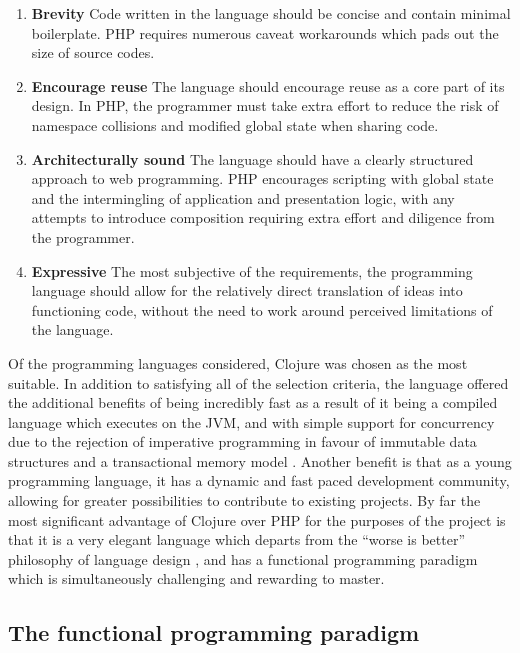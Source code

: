 \begin{enumerate}
\item \textbf{Brevity} Code written in the language should be concise
  and contain minimal boilerplate. PHP requires numerous caveat
  workarounds which pads out the size of source codes.
\item \textbf{Encourage reuse} The language should encourage reuse as
  a core part of its design. In PHP, the programmer must take extra
  effort to reduce the risk of namespace collisions and modified
  global state when sharing code.
\item \textbf{Architecturally sound} The language should have a
  clearly structured approach to web programming. PHP encourages
  scripting with global state and the intermingling of application and
  presentation logic, with any attempts to introduce composition
  requiring extra effort and diligence from the programmer.
\item \textbf{Expressive} The most subjective of the requirements, the
  programming language should allow for the relatively direct
  translation of ideas into functioning code, without the need to work
  around perceived limitations of the language.
\end{enumerate}

Of the programming languages considered, Clojure was chosen as the
most suitable. In addition to satisfying all of the selection
criteria, the language offered the additional benefits of being
incredibly fast as a result of it being a compiled language which
executes on the JVM, and with simple support for concurrency due to
the rejection of imperative programming in favour of immutable data
structures and a transactional memory model
\cite{halloway2009programming, kraus2009multi}. Another benefit is
that as a young programming language, it has a dynamic and fast paced
development community, allowing for greater possibilities to
contribute to existing projects. By far the most significant advantage
of Clojure over PHP for the purposes of the project is that it is a
very elegant language which departs from the ``worse is better''
philosophy of language design \cite{gabriel1991rise}, and has a
functional programming paradigm which is simultaneously challenging
and rewarding to master.

\subsection{The functional programming paradigm}\label{subsec:functional-programming-paradigm}

